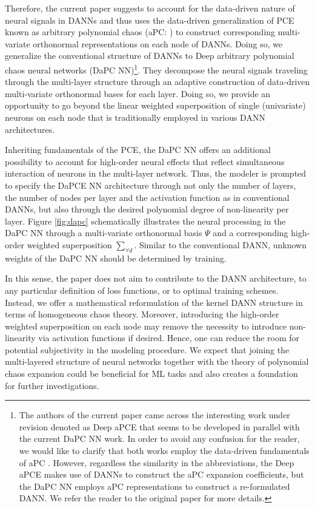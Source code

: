 \documentclass[a4paper,fleqn]{article}
\newcommand{\rw}[1]{\textcolor{blue}{#1}}
\newcommand{\del}[1]{\textcolor{red}{\sout{#1}}}
\renewcommand{\del}[1]{}
\renewcommand{\rw}[1]{#1}
\begin{document}
Therefore, the current paper suggests to account for the data-driven nature of neural signals in DANNs and thus uses the data-driven generalization of PCE known as arbitrary polynomial chaos (aPC: \cite{OladNowak_RESS2012}) to construct corresponding multi-variate orthonormal representations on each node of DANNs.  Doing so, we generalize the conventional structure of DANNs to Deep arbitrary polynomial chaos neural networks (DaPC NN)\footnote{The authors of the current paper came across the interesting work under revision \cite{zheng2021minidatadriven} denoted as Deep aPCE that seems to be developed in parallel with the current DaPC NN work. In order to avoid any confusion for the reader, we would like to clarify that both works employ the data-driven fundamentals of aPC \cite{OladNowak_RESS2012}. However, regardless the similarity in the abbreviations, the Deep aPCE makes use of DANNs to construct the aPC expansion coefficients, but the DaPC NN employs aPC representations to construct a re-formulated DANN. We refer the reader to the original paper \cite{zheng2021minidatadriven} for more details.}. They decompose the neural signals traveling through the multi-layer structure through an adaptive construction of data-driven multi-variate orthonormal bases for each layer. Doing so, we provide an opportunity to go beyond the linear weighted superposition of single (\rw{univariate}) neurons on each node that is traditionally employed in various DANN architectures. 

Inheriting fundamentals of the PCE, the DaPC NN offers an additional possibility to account for high-order neural effects that reflect simultaneous interaction of neurons in the multi-layer network. Thus, the modeler is prompted to specify the DaPCE NN architecture through not only the number of layers, the number of nodes per layer and the activation function as in conventional DANNs, but \del{as well} \rw{also} through the desired polynomial degree of non-linearity per layer. Figure \ref{fig:dapc} schematically illustrates the neural processing in the DaPC NN through a multi-variate orthonormal basis $\Psi$ and a corresponding high-order weighted superposition $\sum\limits_{\forall d}$. Similar to the conventional DANN, unknown weights of the DaPC NN should be determined by training. 

In this sense, the paper does not aim to contribute to the DANN architecture, to any particular definition of loss functions, or to optimal training schemes. Instead, we offer a mathematical reformulation of the kernel DANN structure in terms of homogeneous chaos theory.  Moreover, introducing the high-order weighted superposition on each node may remove the necessity to introduce non-linearity via activation functions if desired. Hence, one can reduce the room for potential subjectivity in the modeling procedure.  We expect that joining the multi-layered structure of neural networks together with the theory of polynomial chaos expansion could be beneficial for ML tasks and also creates a foundation for further investigations.
\end{document}
